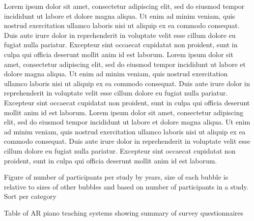 \documentclass[manuscript,screen]{acmart}
\begin{document}
Lorem ipsum dolor sit amet, consectetur adipiscing elit, sed do eiusmod tempor incididunt ut labore et dolore magna aliqua. Ut enim ad minim veniam, quis nostrud exercitation ullamco laboris nisi ut aliquip ex ea commodo consequat. Duis aute irure dolor in reprehenderit in voluptate velit esse cillum dolore eu fugiat nulla pariatur. Excepteur sint occaecat cupidatat non proident, sunt in culpa qui officia deserunt mollit anim id est laborum. Lorem ipsum dolor sit amet, consectetur adipiscing elit, sed do eiusmod tempor incididunt ut labore et dolore magna aliqua. Ut enim ad minim veniam, quis nostrud exercitation ullamco laboris nisi ut aliquip ex ea commodo consequat. Duis aute irure dolor in reprehenderit in voluptate velit esse cillum dolore eu fugiat nulla pariatur. Excepteur sint occaecat cupidatat non proident, sunt in culpa qui officia deserunt mollit anim id est laborum. Lorem ipsum dolor sit amet, consectetur adipiscing elit, sed do eiusmod tempor incididunt ut labore et dolore magna aliqua. Ut enim ad minim veniam, quis nostrud exercitation ullamco laboris nisi ut aliquip ex ea commodo consequat. Duis aute irure dolor in reprehenderit in voluptate velit esse cillum dolore eu fugiat nulla pariatur. Excepteur sint occaecat cupidatat non proident, sunt in culpa qui officia deserunt mollit anim id est laborum.


Figure of number of participants per study by years, size of each bubble is relative to sizes of other bubbles and based on number of participants in a study. Sort per category 

Table of AR piano teaching systems showing summary of survey
questionnaires



\end{document}
